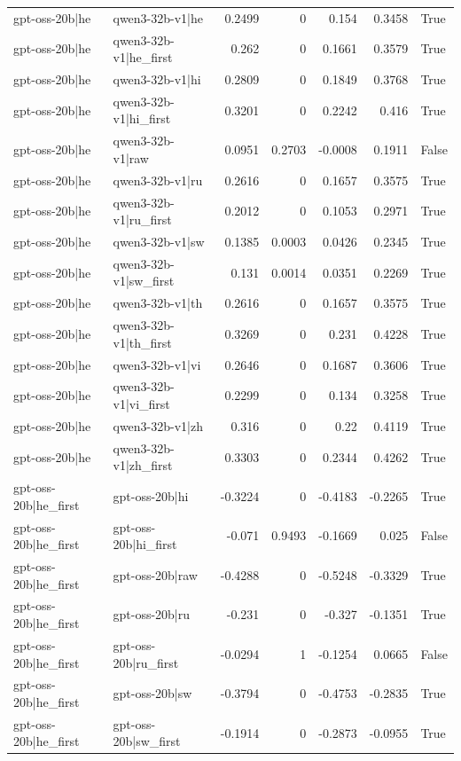 \begin{table}
\begin{tabular}{l l r r r r l}
gpt-oss-20b|he & qwen3-32b-v1|he & 0.2499 & 0 & 0.154 & 0.3458 & True \\
gpt-oss-20b|he & qwen3-32b-v1|he_first & 0.262 & 0 & 0.1661 & 0.3579 & True \\
gpt-oss-20b|he & qwen3-32b-v1|hi & 0.2809 & 0 & 0.1849 & 0.3768 & True \\
gpt-oss-20b|he & qwen3-32b-v1|hi_first & 0.3201 & 0 & 0.2242 & 0.416 & True \\
gpt-oss-20b|he & qwen3-32b-v1|raw & 0.0951 & 0.2703 & -0.0008 & 0.1911 & False \\
gpt-oss-20b|he & qwen3-32b-v1|ru & 0.2616 & 0 & 0.1657 & 0.3575 & True \\
gpt-oss-20b|he & qwen3-32b-v1|ru_first & 0.2012 & 0 & 0.1053 & 0.2971 & True \\
gpt-oss-20b|he & qwen3-32b-v1|sw & 0.1385 & 0.0003 & 0.0426 & 0.2345 & True \\
gpt-oss-20b|he & qwen3-32b-v1|sw_first & 0.131 & 0.0014 & 0.0351 & 0.2269 & True \\
gpt-oss-20b|he & qwen3-32b-v1|th & 0.2616 & 0 & 0.1657 & 0.3575 & True \\
gpt-oss-20b|he & qwen3-32b-v1|th_first & 0.3269 & 0 & 0.231 & 0.4228 & True \\
gpt-oss-20b|he & qwen3-32b-v1|vi & 0.2646 & 0 & 0.1687 & 0.3606 & True \\
gpt-oss-20b|he & qwen3-32b-v1|vi_first & 0.2299 & 0 & 0.134 & 0.3258 & True \\
gpt-oss-20b|he & qwen3-32b-v1|zh & 0.316 & 0 & 0.22 & 0.4119 & True \\
gpt-oss-20b|he & qwen3-32b-v1|zh_first & 0.3303 & 0 & 0.2344 & 0.4262 & True \\
gpt-oss-20b|he_first & gpt-oss-20b|hi & -0.3224 & 0 & -0.4183 & -0.2265 & True \\
gpt-oss-20b|he_first & gpt-oss-20b|hi_first & -0.071 & 0.9493 & -0.1669 & 0.025 & False \\
gpt-oss-20b|he_first & gpt-oss-20b|raw & -0.4288 & 0 & -0.5248 & -0.3329 & True \\
gpt-oss-20b|he_first & gpt-oss-20b|ru & -0.231 & 0 & -0.327 & -0.1351 & True \\
gpt-oss-20b|he_first & gpt-oss-20b|ru_first & -0.0294 & 1 & -0.1254 & 0.0665 & False \\
gpt-oss-20b|he_first & gpt-oss-20b|sw & -0.3794 & 0 & -0.4753 & -0.2835 & True \\
gpt-oss-20b|he_first & gpt-oss-20b|sw_first & -0.1914 & 0 & -0.2873 & -0.0955 & True \\

\end{tabular}
\end{table}
